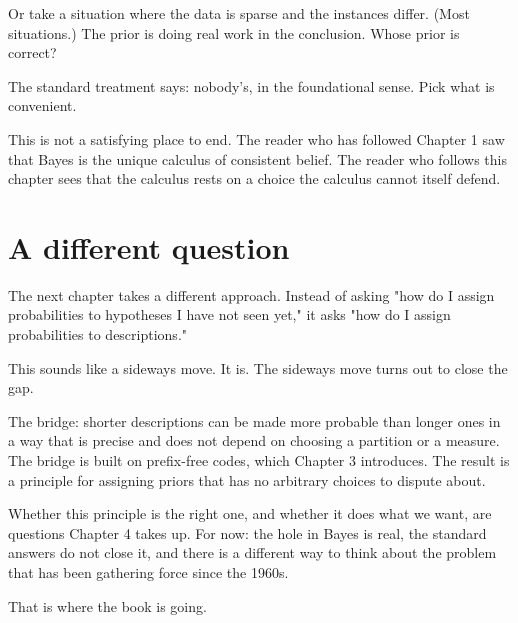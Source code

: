 Or take a situation where the data is sparse and the instances differ. (Most situations.) The prior is doing real work in the conclusion. Whose prior is correct?

The standard treatment says: nobody's, in the foundational sense. Pick what is convenient.

This is not a satisfying place to end. The reader who has followed Chapter 1 saw that Bayes is the unique calculus of consistent belief. The reader who follows this chapter sees that the calculus rests on a choice the calculus cannot itself defend.

\section*{A different question}

The next chapter takes a different approach. Instead of asking "how do I assign probabilities to hypotheses I have not seen yet," it asks "how do I assign probabilities to descriptions."

This sounds like a sideways move. It is. The sideways move turns out to close the gap.

The bridge: shorter descriptions can be made more probable than longer ones in a way that is precise and does not depend on choosing a partition or a measure. The bridge is built on prefix-free codes, which Chapter 3 introduces. The result is a principle for assigning priors that has no arbitrary choices to dispute about.

Whether this principle is the right one, and whether it does what we want, are questions Chapter 4 takes up. For now: the hole in Bayes is real, the standard answers do not close it, and there is a different way to think about the problem that has been gathering force since the 1960s.

That is where the book is going.
